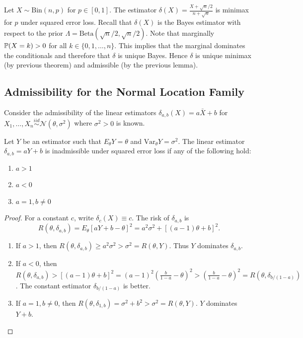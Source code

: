\begin{example}
	Let $X \sim \text{Bin}(n, p)$ for $p \in [0, 1]$. The estimator $\delta(X) = \frac{X + \sqrt{n}/2}{n + \sqrt{n}}$ is minimax for $p$ under squared error loss. Recall that $\delta(X)$ is the Bayes estimator with respect to the prior $\Lambda = \text{Beta}(\sqrt{n}/2, \sqrt{n}/2)$. Note that marginally $\mathbb{P}(X = k) > 0$ for all $k \in \{0, 1, \dots, n\}$. This implies that the marginal dominates the conditionals and therefore that $\delta$ is unique Bayes. Hence $\delta$ is unique minimax (by previous theorem) and admissible (by the previous lemma). 
\end{example}


\subsection{Admissibility for the Normal Location Family}
\noindent Consider the admissibility of the linear estimators $\delta_{a,b}(X) = a\bar{X} + b$ for $X_1, \dots, X_n \overset{iid}{\sim} \mathcal{N}(\theta, \sigma^2)$ where $\sigma^2 > 0$ is known.

\begin{theorem}
	Let $Y$ be an estimator such that $E_\theta Y = \theta$ and $\text{Var}_\theta Y = \sigma^2$. The linear estimator $\delta_{a,b} = aY + b$ is inadmissible under squared error loss if any of the following hold:
	\begin{enumerate}
		\item[(i)] $a > 1$
		\item[(ii)] $a < 0$
		\item[(iii)] $a = 1, b \neq 0$
	\end{enumerate}
\end{theorem}

\begin{proof}
	For a constant $c$, write $\delta_c(X) \equiv c$. The risk of $\delta_{a,b}$ is
	\[
		R(\theta, \delta_{a,b}) = E_\theta[aY + b - \theta]^2 = a^2\sigma^2 + [(a-1)\theta + b]^2.
	\]
	\begin{enumerate}
		\item[(i)] If $a > 1$, then $R(\theta, \delta_{a,b}) \ge a^2\sigma^2 > \sigma^2 = R(\theta, Y)$. Thus $Y$ dominates $\delta_{a,b}$.
		\item[(ii)] If $a < 0$, then $R(\theta, \delta_{a,b}) > [(a-1)\theta + b]^2 = (a-1)^2(\frac{b}{1-a} - \theta)^2 > (\frac{b}{1-a} - \theta)^2 = R(\theta, \delta_{b/(1-a)})$. The constant estimator $\delta_{b/(1-a)}$ is better.
		\item[(iii)] If $a = 1, b \neq 0$, then $R(\theta, \delta_{1,b}) = \sigma^2 + b^2 > \sigma^2 = R(\theta, Y)$. $Y$ dominates $Y+b$.
	\end{enumerate}
\end{proof}

